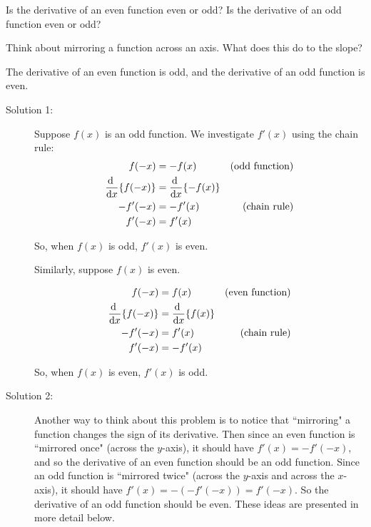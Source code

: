 \begin{Mquestion}\label{1.2_derivevenodd}
Is the derivative of an even function even or odd? Is the derivative of an odd function even or odd?
\end{Mquestion}
\begin{hint}
Think about mirroring a function across an axis. What does this do to the slope?
\end{hint}
\begin{answer}
The derivative of an even function is odd, and the derivative of an odd function is even.
\end{answer}
\begin{solution}

\begin{description}
\item[Solution 1:] Suppose $f(x)$ is an odd function. We investigate $f'(x)$ using the chain rule:
\begin{alignat*}{3}
f(-x)&=-f(x)& \mbox{(odd function)}\\
\diff{}{x}\{f(-x)\}&=\diff{}{x}\{-f(x)\}\\
-f'(-x)&=-f'(x) & \mbox{(chain rule)}\\
f'(-x)&=f'(x)
\end{alignat*}

So, when $f(x)$ is odd, $f'(x)$ is even.

Similarly, suppose $f(x)$ is even.

\begin{alignat*}{3}
f(-x)&=f(x)& \mbox{(even function)}\\
\diff{}{x}\{f(-x)\}&=\diff{}{x}\{f(x)\}\\
-f'(-x)&=f'(x) & \mbox{(chain rule)}\\
f'(-x)&=-f'(x)
\end{alignat*}

So, when $f(x)$ is even,  $f'(x)$ is odd.


\item[Solution 2:]
Another way to think about this problem is to notice that ``mirroring" a function changes the sign of its derivative. Then since an even function is ``mirrored once" (across the $y$-axis), it should have $f'(x)=-f'(-x)$, and so the derivative of an even function should be an odd function. Since an odd function is ``mirrored twice" (across the $y$-axis and across the $x$-axis), it should have $f'(x)=-(-f'(-x))=f'(-x)$. So the derivative of an odd function should be even.
These ideas are presented in more detail below.


\end{description}
\end{solution}
